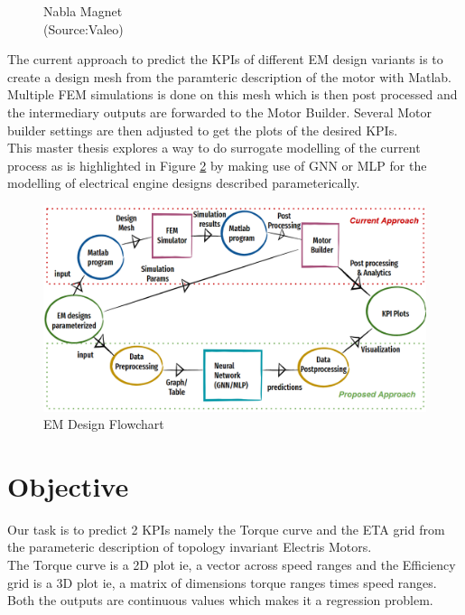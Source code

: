 \documentclass{report} %
\begin{document}
\begin{figure}[H]
\begin{minipage}[b]{0.325\textwidth}
        \caption{\centering Nabla Magnet\\ (Source:Valeo)}
        \label{fig:Nabla Magnet}
    \end{minipage}
\end{figure}
The current approach to predict the \ac{KPI}s of different \ac{EM} design variants is to create a design mesh from the paramteric description of the motor with Matlab.
Multiple FEM simulations is done on this mesh which is then post processed and the intermediary outputs are forwarded to the Motor Builder.
Several Motor builder settings are then adjusted to get the plots of the desired \ac{KPI}s.\\
This master thesis explores a way to do surrogate modelling of the current process as is highlighted in Figure \ref{fig:EM Design Flowchart} by making use of \ac{GNN} or \ac{MLP} for the modelling of electrical engine designs described parameterically. \\
\begin{figure}[H]
    \centering
    \includegraphics[width=1\textwidth]{./ReportImages/EM_design_flowchart_v2.png} 
    \caption{EM Design Flowchart}
    \label{fig:EM Design Flowchart}
\end{figure}


\section{Objective}\label{sec:Objective}
Our task is to predict 2 KPIs namely the Torque curve and the ETA grid from the parameteric description of topology invariant Electris Motors. \\
The Torque curve is a 2D plot ie, a vector across speed ranges and the Efficiency grid is a 3D plot ie, a matrix of dimensions torque ranges times speed ranges. \\
Both the outputs are continuous values which makes it a regression problem. \\
\end{document}
